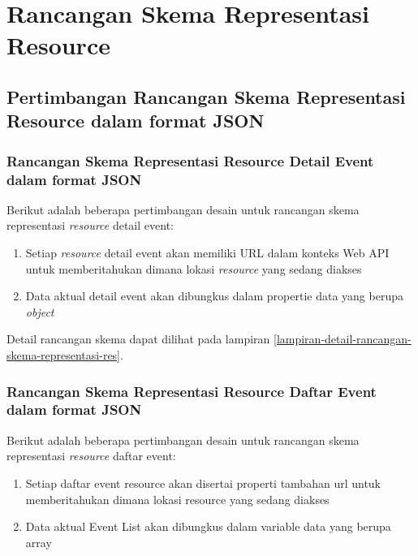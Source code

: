 \documentclass[a4paper, 12pt, oneside]{report}
\begin{document}
\section{Rancangan Skema Representasi Resource}

\subsection{Pertimbangan Rancangan Skema Representasi Resource dalam format JSON}

\subsubsection{Rancangan Skema Representasi Resource Detail Event dalam format JSON}

\onehalfspacing Berikut adalah beberapa pertimbangan desain untuk rancangan skema representasi \textit{resource} detail event:

\begin{enumerate}
  \item Setiap \textit{resource} detail event akan memiliki URL dalam konteks Web API untuk memberitahukan dimana lokasi \textit{resource} yang sedang diakses
  \item Data aktual detail event akan dibungkus dalam propertie data yang berupa \textit{object}
\end{enumerate}

Detail rancangan skema dapat dilihat pada lampiran \ref{lampiran-detail-rancangan-skema-representasi-res}.

\subsubsection{Rancangan Skema Representasi Resource Daftar Event dalam format JSON}

\onehalfspacing Berikut adalah beberapa pertimbangan desain untuk rancangan skema representasi \textit{resource} daftar event:

\begin{enumerate}
  \item Setiap daftar event resource akan disertai properti tambahan url untuk memberitahukan dimana lokasi resource yang sedang diakses
  \item Data aktual Event List akan dibungkus dalam variable data yang berupa array
\end{enumerate}
\end{document}
